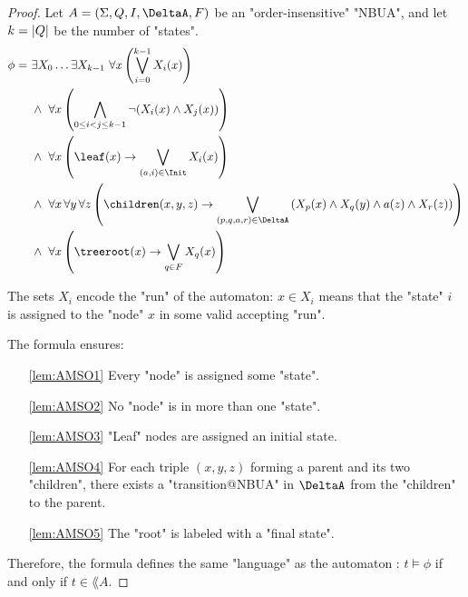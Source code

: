 \documentclass[a4paper,UKenglish,cleveref, autoref, thm-restate]{lipics-v2021}
\begin{document}
\begin{proof}\label{lem:Aut-to-MSO}
	Let $A = \NBUA$ be an "order-insensitive" "NBUA", and let $k = \left|Q\right|$ be the number of "states".
	\begin{align}
		\phi =\  & \exists X_0 \ldots \exists X_{k-1} \ \forall x \left( \bigvee_{i=0}^{k-1} X_i(x) \right) \label{lem:AMSO1}                                                                                     \\
		         & \land\ \forall x \left( \bigwedge_{0 \leq i < j \leq k-1} \lnot (X_i(x) \land X_j(x)) \right) \label{lem:AMSO2}                                                                                \\
		         & \land\ \forall x \left( \leaf(x) \rightarrow \bigvee_{(a,i) \in \Init} X_i(x) \right) \label{lem:AMSO3}                                                                                        \\
		         & \land\ \forall x\, \forall y\, \forall z \left(\children(x,y,z) \rightarrow \bigvee_{(p,q,a,r) \in \DeltaA} \left(X_p(x) \land X_q(y) \land a(z) \land X_r(z)\right) \right) \label{lem:AMSO4} \\
		         & \land\ \forall x \left( \treeroot(x) \rightarrow \bigvee_{q \in F} X_q(x) \right) \label{lem:AMSO5}
	\end{align}

	The sets $X_i$ encode the "run" of the automaton: $x \in X_i$ means that the "state" $i$ is assigned to the "node" $x$ in some valid accepting "run".

	The formula ensures:

	\begin{itemize}
		\item[\ref{lem:AMSO1}] Every "node" is assigned some "state".
		\item[\ref{lem:AMSO2}] No "node" is in more than one "state".
		\item[\ref{lem:AMSO3}] "Leaf" nodes are assigned an initial state.
		\item[\ref{lem:AMSO4}] For each triple $(x,y,z)$ forming a parent and its two "children",
		      there exists a "transition@NBUA" in $\DeltaA$ from the "children" to the parent.
		\item[\ref{lem:AMSO5}] The "root" is labeled with a "final state".
	\end{itemize}

	Therefore, the formula defines the same "language" as the automaton : $t \models \phi$ if and only if  $t \in \lang A$.
\end{proof}
\end{document}
